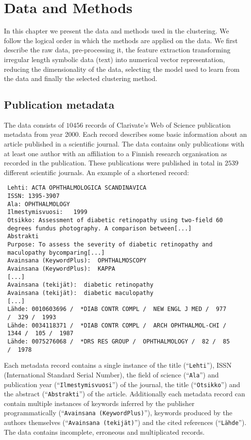 \chapter{Data and Methods}
\label{chapter:methods}
In this chapter we present the data and methods used in the 
clustering. We follow the logical order in which the methods are 
applied on the data. We first describe the raw data, 
pre-processing it, the feature extraction transforming irregular
length symbolic data (text) into numerical vector representation,
reducing the dimensionality of the data, selecting the model used 
to learn from the data and finally the selected clustering method.

\section{Publication metadata}
\label{section:metadata}
The data consists of $10456$ records of Clarivate's Web of Science 
publication metadata from year 2000. Each record describes some 
basic information about an article published in a scientific 
journal. The data contains only publications with at least one
author with an affiliation to a Finnish research organisation as
recorded in the publication. These publications were published in 
total in $2539$ different scientific journals.
An example of a shortened record:
\begin{verbatim}
 Lehti: ACTA OPHTHALMOLOGICA SCANDINAVICA
 ISSN: 1395-3907
 Ala: OPHTHALMOLOGY
 Ilmestymisvuosi:   1999
 Otsikko: Assessment of diabetic retinopathy using two-field 60 
 degrees fundus photography. A comparison between[...]
 Abstrakti
 Purpose: To assess the severity of diabetic retinopathy and 
 maculopathy bycomparing[...]
 Avainsana (KeywordPlus):  OPHTHALMOSCOPY
 Avainsana (KeywordPlus):  KAPPA
 [...]
 Avainsana (tekijät):  diabetic retinopathy
 Avainsana (tekijät):  diabetic maculopathy
 [...]
 Lähde: 0010603696 /  *DIAB CONTR COMPL /  NEW ENGL J MED /  977 
 /  329 /  1993
 Lähde: 0034118371 /  *DIAB CONTR COMPL /  ARCH OPHTHALMOL-CHI /  
 1344 /  105 /  1987
 Lähde: 0075276068 /  *DRS RES GROUP /  OPHTHALMOLOGY /  82 /  85 
 /  1978
 \end{verbatim}
 
Each metadata record contains a single instance of the title 
(``\texttt{Lehti}''), ISSN (International Standard Serial Number), 
the field of science (``\texttt{Ala}'') and publication year 
(``\texttt{Ilmestymisvuosi}'') of the journal, the title 
(``\texttt{Otsikko}'') and the abstract (``\texttt{Abstrakti}'') 
of the article. Additionally each metadata record can contain
multiple instances of keywords inferred by the publisher programmatically
(``\texttt{Avainsana (KeywordPlus)}''), keywords produced by the 
authors themselves (``\texttt{Avainsana (tekijät)}'') and the 
cited references (``\texttt{Lähde}''). The data contains incomplete,
erroneous and multiplicated records.

